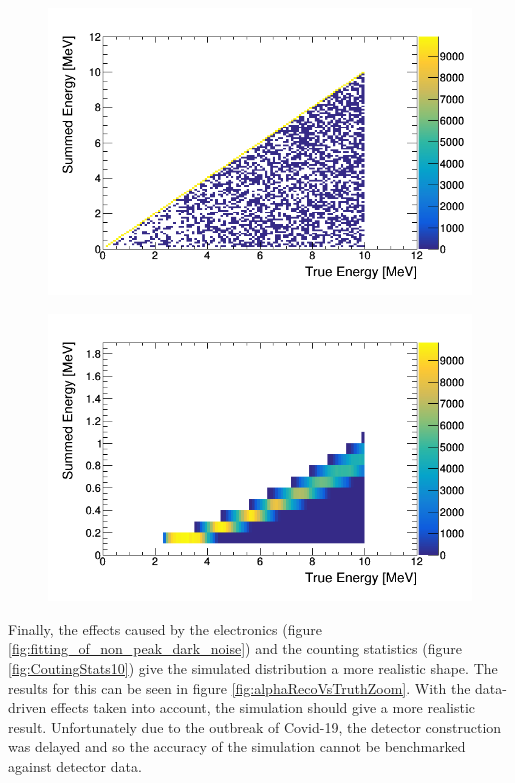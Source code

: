 \begin{figure}[!h]
 \centering
 \includegraphics[width=0.7\linewidth]{truth_vs_summed_alpha.png}
 \label{fig:alpha_summed_vs_truth}
\end{figure}
\begin{figure}[!h]
 \centering
 \includegraphics[width=0.7\linewidth]{Chapter4/Figs/Raster/truth_vs_visSummed_alpha_zoom.png}
 \label{fig:alphaVisVsTruthZoom}
\end{figure}


Finally, the effects caused by the electronics (figure \ref{fig:fitting_of_non_peak_dark_noise}) and the counting statistics (figure \ref{fig:CoutingStats10}) give the simulated distribution a more realistic shape. The results for this can be seen in figure \ref{fig:alphaRecoVsTruthZoom}. With the data-driven effects taken into account, the simulation should give a more realistic result. Unfortunately due to the outbreak of Covid-19, the detector construction was delayed and so the accuracy of the simulation cannot be benchmarked against detector data. 

